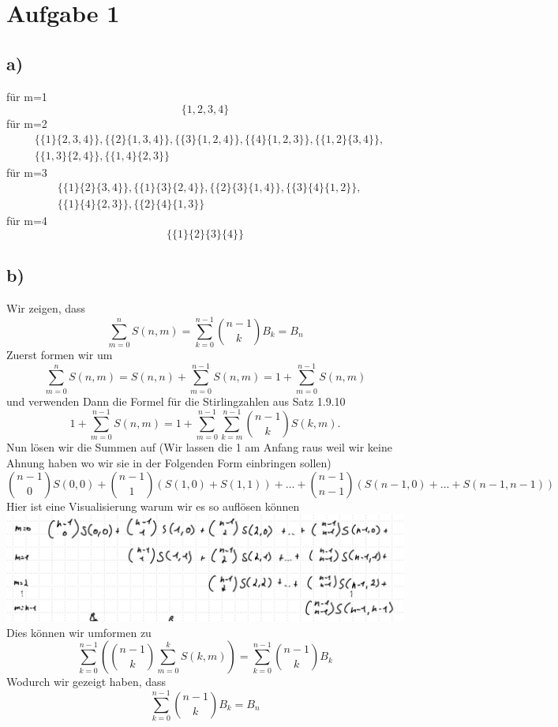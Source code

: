 \section*{Aufgabe 1}
\subsection*{a)}
für m=1
\[
  \{1, 2, 3, 4\}
\]
für m=2
\begin{align*}
  &\{\{1\}\{2,3,4\}\},\{\{2\}\{1,3,4\}\},\{\{3\}\{1,2,4\}\},\{\{4\}\{1,2,3\}\},\{\{1,2\}\{3,4\}\}, \\
  &\{\{1,3\}\{2,4\}\},\{\{1,4\}\{2,3\}\}
\end{align*}
für m=3
\begin{align*}
  &\{\{1\}\{2\}\{3,4\}\},\{\{1\}\{3\}\{2,4\}\},\{\{2\}\{3\}\{1,4\}\},\{\{3\}\{4\}\{1,2\}\},\\
  &\{\{1\}\{4\}\{2,3\}\},\{\{2\}\{4\}\{1,3\}\}
\end{align*}
für m=4
\[
  \{\{1\}\{2\}\{3\}\{4\}\}
\]

\pagebreak
\subsection*{b)}
Wir zeigen, dass 
\[
  \sum_{m=0}^{n} S(n,m) = \sum_{k=0}^{n-1} \binom{n-1}{k}B_k = B_n
\]
Zuerst formen wir um
\[
  \sum_{m=0}^{n} S(n,m) = S(n,n) + \sum_{m=0}^{n-1} S(n,m) = 1 + \sum_{m=0}^{n-1} S(n,m)
\]
und verwenden Dann die Formel für die Stirlingzahlen aus Satz 1.9.10
\[
  1 + \sum_{m=0}^{n-1} S(n,m) = 1 + \sum_{m=0}^{n-1} \sum_{k=m}^{n-1} \binom{n-1}{k} S(k,m) .
\]
Nun lösen wir die Summen auf (Wir lassen die 1 am Anfang raus weil wir keine Ahnung haben wo wir sie in der Folgenden Form einbringen sollen)
\[
  \binom{n-1}{0}S(0,0) + \binom{n-1}{1}(S(1,0) + S(1,1)) + \ldots + \binom{n-1}{n-1}(S(n-1,0) + \ldots + S(n-1,n-1))
\]
Hier ist eine Visualisierung warum wir es so auflösen können \\
\includegraphics[width=\linewidth]{img/ex1.jpeg} \\
Dies können wir umformen zu
\[
  \sum_{k=0}^{n-1}\left(\binom{n-1}{k} \sum_{m=0}^{k}S(k,m)\right) = \sum_{k=0}^{n-1}\binom{n-1}{k} B_k
\]
Wodurch wir gezeigt haben, dass
\[
  \sum_{k=0}^{n-1} \binom{n-1}{k}B_k = B_n
\]

